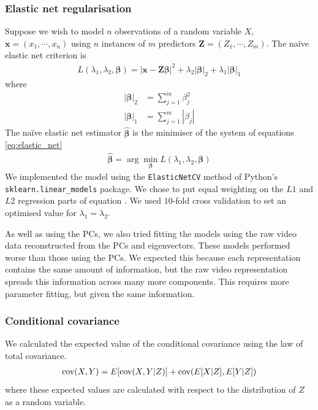         \subsubsection{Elastic net regularisation}
        Suppose we wish to model $n$ observations of a random variable $X$, $\mathbf{x} = (x_1, \cdots, x_n)$ using $n$ instances of $m$ predictors $\mathbf{Z} = (Z_1, \cdots, Z_m)$. The na\"{i}ve elastic net criterion is
        \begin{align}\label{eq:elastic_net}
            L(\lambda_1, \lambda_2, \boldsymbol{\beta}) = | \mathbf{x} - \mathbf{Z} \boldsymbol{\beta} |^2 + \lambda_2 |\boldsymbol{\beta}|_2 + \lambda_1 |\boldsymbol{\beta}|_1
        \end{align}
        where
        \begin{align}
          |\boldsymbol{\beta}|_2 &= \sum_{j=1}^m \beta_j^2 \\
          |\boldsymbol{\beta}|_1 &= \sum_{j=1}^m |\beta_j|
        \end{align}
        The na\"{i}ve elastic net estimator $\hat{\boldsymbol{\beta}}$ is the minimiser of the system of equations \ref{eq:elastic_net}  \parencite{zou}
        \begin{align}
          \hat{\boldsymbol{\beta}} = \arg \min_{\boldsymbol{\beta}} L(\lambda_1, \lambda_2, \boldsymbol{\beta})
        \end{align}
        We implemented the model using the \texttt{ElasticNetCV} method of Python's \\ \texttt{sklearn.linear\_models} package. We chose to put equal weighting on the $L1$ and $L2$ regression parts of equation \label{eq:elastic_net}. We used $10$-fold cross validation to set an  optimised value for $\lambda_1 = \lambda_2$.

        As well as using the PCs, we also tried fitting the models using the raw video data reconstructed from the PCs and eigenvectors. These models performed worse than those using the PCs. We expected this because each representation contains the same amount of information, but the raw video representation spreads this information across many more components. This requires more parameter fitting, but given the same information.

        \subsubsection{Conditional covariance}\label{sec:conditional_covariance}
        We calculated the expected value of the conditional covariance using the law of total covariance.
        \begin{align}\label{eq:law_of_total_covariance}
            \text{cov} (X,Y) = E[ \text{cov}(X,Y|Z)] + \text{cov}(E[X|Z], E[Y|Z])
        \end{align}
        where these expected values are calculated with respect to the distribution of $Z$ as a random variable.

